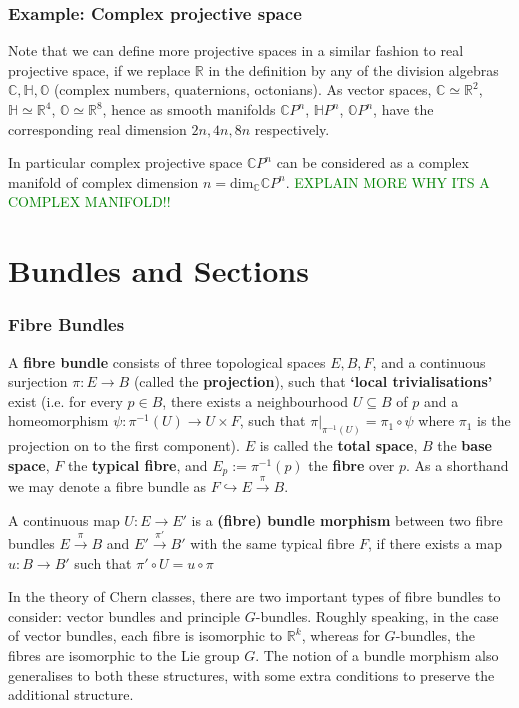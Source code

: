 \documentclass[a4paper]{article}
\theoremstyle{definition} \newtheorem*{definition}{Definition}
\theoremstyle{definition} \newtheorem*{definitions}{Definitions}
\theoremstyle{plain} \newtheorem{theorem}{Theorem}[section]
\theoremstyle{plain} \newtheorem{proposition}[theorem]{Proposition}
\theoremstyle{plain} \newtheorem{corollary}[theorem]{Corollary}
\theoremstyle{plain} \newtheorem{lemma}[theorem]{Lemma}
\theoremstyle{plain} \newtheorem{example}[theorem]{Example}
\newcommand{\finish}[1]{\textcolor{green}{#1}}
\newcommand{\defn}[1]{\textbf{#1}}
\newcommand{\realnos}{\mathbb{R}}
\newcommand{\complexnos}{\mathbb{C}}
\begin{document}
\subsubsection{Example: Complex projective space}

Note that we can define more projective spaces in a similar fashion to real projective space, if we replace $\realnos$ in the definition by any of the division algebras $\complexnos, \mathbb{H}, \mathbb{O}$ (complex numbers, quaternions, octonians). As vector spaces, $\complexnos \simeq \realnos^2$, $\mathbb{H} \simeq \realnos^4$, $\mathbb{O} \simeq \realnos^8$, hence as smooth manifolds $\complexnos P^n$, $\mathbb{H}P^n$, $\mathbb{O}P^n$, have the corresponding real dimension $2n, 4n, 8n$ respectively.

In particular complex projective space $\complexnos P^n$ can be considered as a complex manifold of complex dimension $n=\text{dim}_\complexnos \complexnos P^n$. \finish{EXPLAIN MORE WHY ITS A COMPLEX MANIFOLD!!}

\section{Bundles and Sections}

\subsubsection{Fibre Bundles}

A \defn{fibre bundle} consists of three topological spaces $E, B, F$, and a continuous surjection $\pi:E\rightarrow B$ (called the \defn{projection}), such that \defn{`local trivialisations'} exist (i.e. for every $p\in B$, there exists a neighbourhood $U\subseteq B$ of $p$ and a homeomorphism $\psi: \pi^{-1}(U) \rightarrow U \times F$, such that $\pi \vert_{\pi^{-1}(U)} = \pi_1 \circ \psi$ where $\pi_1$ is the projection on to the first component). $E$ is called the \defn{total space}, $B$ the \defn{base space}, $F$ the \defn{typical fibre}, and $E_p:=\pi^{-1}(p)$ the \defn{fibre} over $p$. As a shorthand we may denote a fibre bundle as $F\hookrightarrow E\xrightarrow{\pi} B$.

A continuous map $U:E\rightarrow E'$ is a \defn{(fibre) bundle morphism} between two fibre bundles $E\xrightarrow{\pi} B$ and $E'\xrightarrow{\pi'} B'$ with the same typical fibre $F$, if there exists a map $u:B\rightarrow B'$ such that $\pi' \circ U = u \circ \pi$

In the theory of Chern classes, there are two important types of fibre bundles to consider: vector bundles and principle $G$-bundles. Roughly speaking, in the case of vector bundles, each fibre is isomorphic to $\realnos^k$, whereas for $G$-bundles, the fibres are isomorphic to the Lie group $G$. The notion of a bundle morphism also generalises to both these structures, with some extra conditions to preserve the additional structure. 
\end{document}
